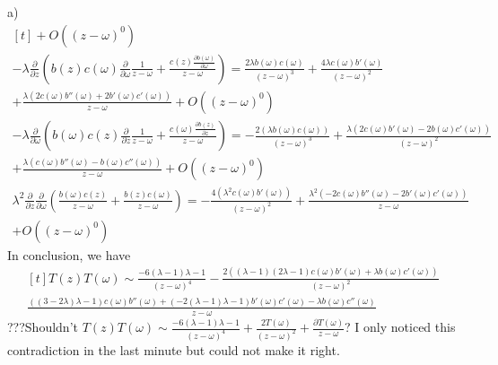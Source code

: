 \documentclass[12pt]{article}
\begin{document}
\begin{paragraph}{a)}
\begin{equation}
\begin{aligned}[t]
+O\left((z-\omega )^0\right)\\
-\lambda  \frac{\partial }{\partial z}\left(b(z) c(\omega ) \frac{\partial }{\partial \omega }\frac{1}{z-\omega }+\frac{c(z) \frac{\partial b(\omega )}{\partial \omega }}{z-\omega }\right)=\frac{2 \lambda  b(\omega ) c(\omega )}{(z-\omega )^3}+\frac{4 \lambda  c(\omega ) b'(\omega )}{(z-\omega )^2}\\
+\frac{\lambda  \left(2 c(\omega ) b''(\omega )+2 b'(\omega ) c'(\omega )\right)}{z-\omega }+O\left((z-\omega )^0\right)\\
-\lambda  \frac{\partial }{\partial \omega }\left(b(\omega ) c(z) \frac{\partial }{\partial z}\frac{1}{z-\omega }+\frac{c(\omega ) \frac{\partial b(z)}{\partial z}}{z-\omega }\right)=-\frac{2 (\lambda  b(\omega ) c(\omega ))}{(z-\omega )^3}+\frac{\lambda  \left(2 c(\omega ) b'(\omega )-2 b(\omega ) c'(\omega )\right)}{(z-\omega )^2}\\
+\frac{\lambda  \left(c(\omega ) b''(\omega )-b(\omega ) c''(\omega )\right)}{z-\omega }+O\left((z-\omega )^0\right)\\
\lambda ^2 \frac{\partial }{\partial z}\frac{\partial }{\partial \omega }\left(\frac{b(\omega ) c(z)}{z-\omega }+\frac{b(z) c(\omega )}{z-\omega }\right)=-\frac{4 \left(\lambda ^2 c(\omega ) b'(\omega )\right)}{(z-\omega )^2}+\frac{\lambda ^2 \left(-2 c(\omega ) b''(\omega )-2 b'(\omega ) c'(\omega )\right)}{z-\omega }\\
+O\left((z-\omega )^0\right)
\end{aligned}
\end{equation}
In conclusion, we have
\begin{equation}
\begin{aligned}[t]
T(z)T(\omega)\sim \frac{-6 (\lambda -1) \lambda -1}{(z-\omega )^4}-\frac{2 \left((\lambda -1) (2 \lambda -1) c(\omega ) b'(\omega )+\lambda  b(\omega ) c'(\omega )\right)}{(z-\omega )^2}\\
\frac{((3-2 \lambda ) \lambda -1) c(\omega ) b''(\omega )+(-2 (\lambda -1) \lambda -1) b'(\omega ) c'(\omega )-\lambda  b(\omega ) c''(\omega )}{z-\omega }
\end{aligned}
\end{equation}
???Shouldn't $T(z)T(\omega) \sim \frac{-6 (\lambda -1) \lambda -1}{(z-\omega )^4}+\frac{2T(\omega)}{(z-\omega)^2}+\frac{\partial T(\omega)}{z-\omega}$? I only noticed this contradiction in the last minute but could not make it right. 
\end{paragraph}
\end{document}
